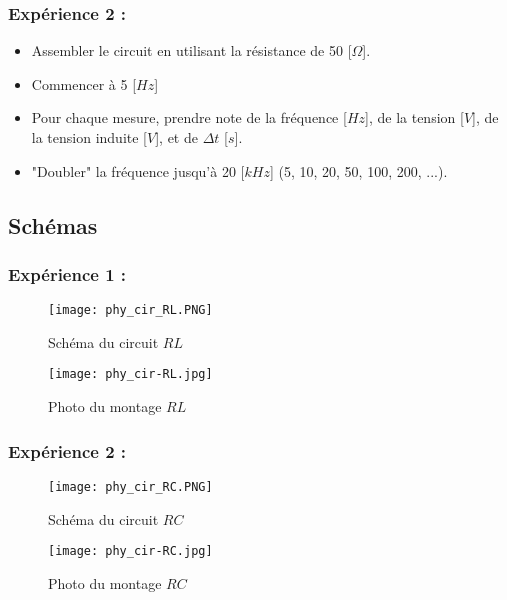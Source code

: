 \subsubsection*{Expérience 2 :}

\begin{itemize}
    \item Assembler le circuit en utilisant la résistance de 50 [$\Omega$].
    \item Commencer à 5 [$Hz$]
    \item Pour chaque mesure, prendre note de la fréquence [$Hz$], de la tension [$V$], de la tension induite [$V$], et de $\Delta t$  [$s$].
    \item "Doubler" la fréquence jusqu'à 20 [$kHz$] (5, 10, 20, 50, 100, 200, ...).
\end{itemize}

\subsection{Schémas}
\label{sec:schema}
\subsubsection*{Expérience 1 :}

\begin{minipage}{.5\textwidth}
\begin{figure}[H]
  \centering
    \texttt{[image: phy\_cir\_RL.PNG]}
    \caption{Schéma du circuit $RL$}
\end{figure}
\end{minipage}
\begin{minipage}{.5\textwidth}
\begin{figure}[H]
  \centering
    \texttt{[image: phy\_cir-RL.jpg]}
    \caption{Photo du montage $RL$}
\end{figure}
\end{minipage}

\subsubsection*{Expérience 2 :}

\begin{minipage}{.5\textwidth}
\begin{figure}[H]
  \centering
    \texttt{[image: phy\_cir\_RC.PNG]}
    \caption{Schéma du circuit $RC$}
\end{figure}
\end{minipage}
\begin{minipage}{.5\textwidth}
\begin{figure}[H]
  \centering
    \texttt{[image: phy\_cir-RC.jpg]}
    \caption{Photo du montage $RC$}
\end{figure}
\end{minipage}
